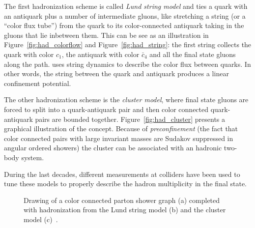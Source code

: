 The first hadronization scheme is called {\it Lund string model} and ties a quark
with an antiquark plus a number of intermediate gluons, like
stretching a string (or a ``color flux tube'') from the quark
to its color-connected antiquark taking in the gluons that
lie inbetween them. This can be see as an illustration in 
Figure~\ref{fig:had_colorflow} and Figure~\ref{fig:had_string}:
the first string collects the quark with color $c_1$, the antiquark
with color $\bar{c}_4$ and all the final state gluons along the path.
 uses string dynamics to describe the color flux between quarks. 
In other words, the string between the quark and antiquark produces a linear
confinement potential.

The other hadronization scheme is the {\it cluster model}, where
final state gluons are forced to split into a quark-antiquark pair
and then color connected quark-antiquark pairs are bounded together.
Figure~\ref{fig:had_cluster} presents a graphical illustration of the
concept. Because of {\it preconfinement} (the fact that color connected pairs
with large invariant masses are Sudakov suppressed in angular ordered showers)
the cluster can be associated with an hadronic two-body system. 

During the last decades, different measurements at colliders have
been used to tune these models to properly describe 
the hadron multiplicity in the final state.


\begin{figure}[hbt]\begin{center}
	\caption{Drawing of a color connected parton shower graph (a) completed with hadronization from the Lund string model (b) and the cluster model (c)~\cite{Mangano:933464}.}
\end{center}\end{figure}




